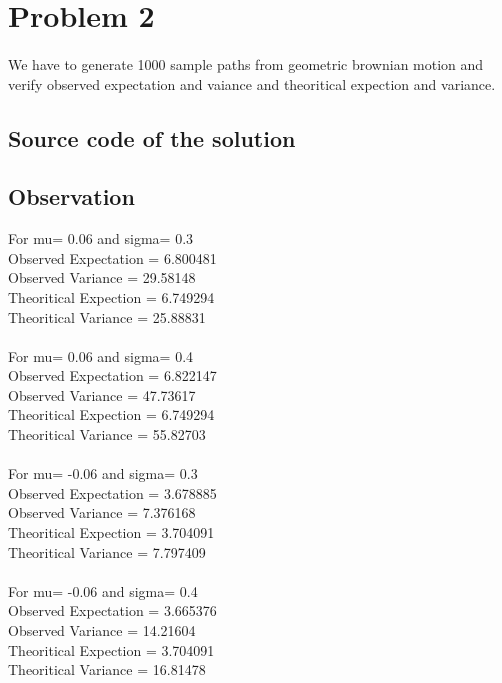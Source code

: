 \documentclass{article}
\begin{document}
		\clearpage
	
		
	
	\section{Problem 2}
	\paragraph{}
		We have to generate 1000 sample paths from geometric brownian motion and verify observed expectation and vaiance and theoritical expection and variance.
		
	
	\subsection{Source code of the solution}
		
		
	
		\subsection{Observation}

For mu= 0.06 and sigma= 0.3 \\
Observed Expectation =  6.800481 \\
Observed Variance =  29.58148 \\
Theoritical Expection =  6.749294 \\
Theoritical Variance =  25.88831 \\
\\
For mu= 0.06 and sigma= 0.4 \\
Observed Expectation =  6.822147 \\
Observed Variance =  47.73617 \\
Theoritical Expection =  6.749294 \\
Theoritical Variance =  55.82703 \\
\\
For mu= -0.06 and sigma= 0.3 \\
Observed Expectation =  3.678885 \\
Observed Variance =  7.376168 \\
Theoritical Expection =  3.704091 \\
Theoritical Variance =  7.797409 \\
\\
For mu= -0.06 and sigma= 0.4 \\
Observed Expectation =  3.665376 \\
Observed Variance =  14.21604 \\
Theoritical Expection =  3.704091 \\
Theoritical Variance =  16.81478\\
	
		
\end{document}
